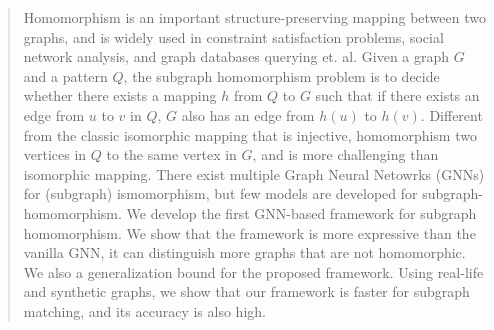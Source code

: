 \documentclass[sigconf,anonymous,review]{article}
\begin{document}
\begin{abstract}
Homomorphism is an important
structure-preserving mapping between two graphs,
and is widely used in constraint satisfaction problems, 
social network analysis, and graph databases querying et. al.
Given a graph $G$ and a pattern $Q$, 
the subgraph homomorphism problem is to decide whether there exists
a mapping $h$ from $Q$ to $G$ such that 
if there exists an edge from $u$ to $v$ in $Q$,
$G$ also has an edge from $h(u)$ to $h(v)$.
Different from the classic isomorphic mapping 
that is injective, 
homomorphism %
 two  vertices in $Q$
to the same vertex in $G$, 
and is more challenging than isomorphic mapping.
There exist multiple Graph Neural Netowrks (GNNs)
for (subgraph) ismomorphism, 
but few models are developed for subgraph-homomorphism.
We develop the first GNN-based framework 
for subgraph homomorphism. We show that 
the framework is more expressive than the vanilla GNN,
\ie it can distinguish more graphs that are 
not homomorphic.
We also a generalization bound for the proposed framework.
Using real-life and synthetic graphs, we 
show that our framework is faster for subgraph matching,
and its accuracy is also high.
\end{abstract}








%



%









	\appendix
	
\end{document}
